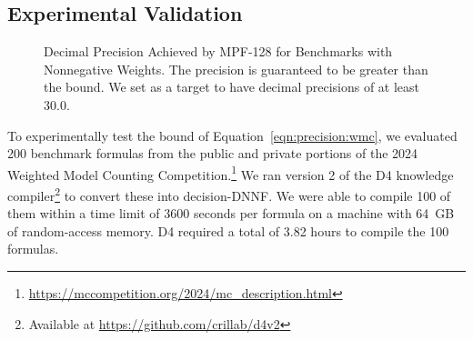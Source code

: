 \documentclass[
hf
]{ceurart}
\begin{document}
\subsection{Experimental Validation}

\begin{figure}
\caption{Decimal Precision Achieved by MPF-128 for Benchmarks with Nonnegative Weights.  The precision is guaranteed to be greater than the bound.
We set as a target to have decimal precisions of at least 30.0.}
\label{fig:pos:mpf}
\end{figure}

To experimentally test the bound of Equation~\ref{eqn:precision:wmc},
we evaluated 200 benchmark formulas from the public and private portions
of the 2024 Weighted Model Counting Competition.\footnote{\url{https://mccompetition.org/2024/mc_description.html}}
We ran version 2 of the
D4 knowledge compiler\footnote{Available at \url{https://github.com/crillab/d4v2}}
to convert these into decision-DNNF\@.
We were able to compile 100 of them within a time
limit of 3600 seconds per formula on a machine with 64~GB of random-access memory.  D4 required a total of 3.82 hours to compile the 100 formulas.
\end{document}
